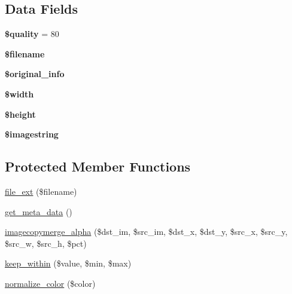 \subsection*{Data Fields}
\begin{DoxyCompactItemize}
\item 
\hypertarget{classabeautifulsite_1_1_simple_image_a0e342ea32cccdc2c932ad23b9796a62a}{{\bfseries \$quality} = 80}\label{classabeautifulsite_1_1_simple_image_a0e342ea32cccdc2c932ad23b9796a62a}

\item 
\hypertarget{classabeautifulsite_1_1_simple_image_a0722441477f957078ee2437054556cbc}{{\bfseries \$filename}}\label{classabeautifulsite_1_1_simple_image_a0722441477f957078ee2437054556cbc}

\item 
\hypertarget{classabeautifulsite_1_1_simple_image_ab0f3ea69c9d9d311d11940fe4784a353}{{\bfseries \$original\-\_\-info}}\label{classabeautifulsite_1_1_simple_image_ab0f3ea69c9d9d311d11940fe4784a353}

\item 
\hypertarget{classabeautifulsite_1_1_simple_image_a5795120b4b324bc4ca83f1e6fdce7d57}{{\bfseries \$width}}\label{classabeautifulsite_1_1_simple_image_a5795120b4b324bc4ca83f1e6fdce7d57}

\item 
\hypertarget{classabeautifulsite_1_1_simple_image_a2c265bba1724371bb03e6901297c30b2}{{\bfseries \$height}}\label{classabeautifulsite_1_1_simple_image_a2c265bba1724371bb03e6901297c30b2}

\item 
\hypertarget{classabeautifulsite_1_1_simple_image_a3abffbc75cede9a7ba56156c8dec06c0}{{\bfseries \$imagestring}}\label{classabeautifulsite_1_1_simple_image_a3abffbc75cede9a7ba56156c8dec06c0}

\end{DoxyCompactItemize}
\subsection*{Protected Member Functions}
\begin{DoxyCompactItemize}
\item 
\hyperlink{classabeautifulsite_1_1_simple_image_ae0e4ad34b7a0b6a4b7e582c4676bd60f}{file\-\_\-ext} (\$filename)
\item 
\hyperlink{classabeautifulsite_1_1_simple_image_a6ed959330a006f41f6c48bcbb9aa2f86}{get\-\_\-meta\-\_\-data} ()
\item 
\hyperlink{classabeautifulsite_1_1_simple_image_a725590e68594a12d631830dfce494571}{imagecopymerge\-\_\-alpha} (\$dst\-\_\-im, \$src\-\_\-im, \$dst\-\_\-x, \$dst\-\_\-y, \$src\-\_\-x, \$src\-\_\-y, \$src\-\_\-w, \$src\-\_\-h, \$pct)
\item 
\hyperlink{classabeautifulsite_1_1_simple_image_a4b91068cc14980876d02cb4d51996c36}{keep\-\_\-within} (\$value, \$min, \$max)
\item 
\hyperlink{classabeautifulsite_1_1_simple_image_aa0cce094a549fbed2a9e7288bd15221f}{normalize\-\_\-color} (\$color)
\end{DoxyCompactItemize}
